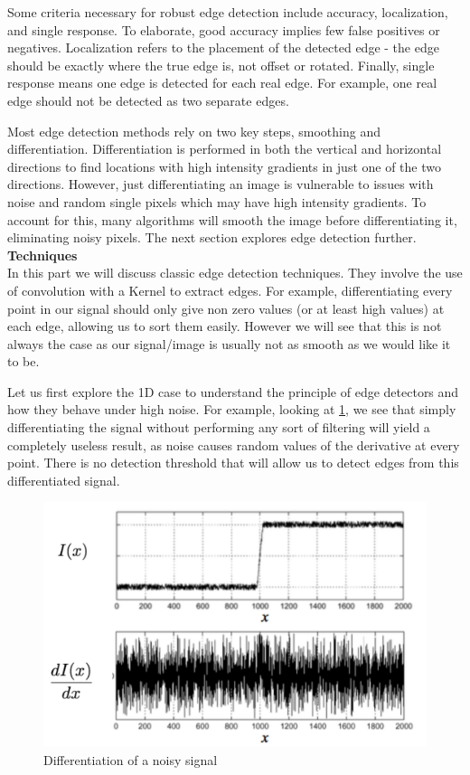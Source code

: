 \documentclass[twoside]{article}
\begin{document}
Some criteria necessary for robust edge detection include accuracy, localization, and single response. To elaborate, good accuracy implies few false positives or negatives.  Localization refers to the placement of the detected edge - the edge should be exactly where the true edge is, not offset or rotated. Finally, single response means one edge is detected for each real edge. For example, one real edge should not be detected as two separate edges.

Most edge detection methods rely on two key steps, smoothing and differentiation. Differentiation is performed in both the vertical and horizontal directions to find locations with high intensity gradients in just one of the two directions. However, just differentiating an image is vulnerable to issues with noise and random single pixels which may have high intensity gradients. To account for this, many algorithms will smooth the image before differentiating it, eliminating noisy pixels. The next section explores edge detection further. \\

\textbf{Techniques}\\
In this part we will discuss classic edge detection techniques. They involve the use of convolution with a Kernel to extract edges. For example, differentiating every point in our signal should only give non zero values (or at least high values) at each edge, allowing us to sort them easily. However we will see that this is not always the case as our signal/image is usually not as smooth as we would like it to be.

Let us first explore the 1D case to understand the principle of edge detectors and how they behave under high noise. For example, looking at \ref{noisy}, we see that simply differentiating the signal without performing any sort of filtering will yield a completely useless result, as noise causes random values of the derivative at every point. There is no detection threshold that will allow us to detect edges from this differentiated signal.

\begin{figure}[h]
	\centering
	\includegraphics[scale=.4]{noisy_uncorrected.PNG}
    \caption{Differentiation of a noisy signal}
    \label{noisy}
\end{figure}
\end{document}
